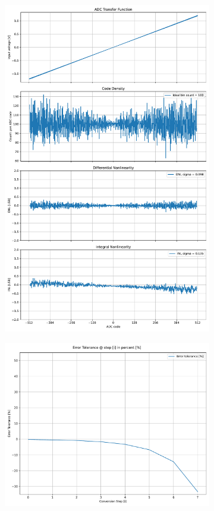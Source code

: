 \documentclass[varwidth]{standalone}
\begin{document}
\begin{figure}
\begin{subfigure}{0.32\textwidth}
    \includegraphics[width=\textwidth]{behavioral_10b_refnoise_nonlinearity.pdf}
\end{subfigure}
\begin{subfigure}{0.32\textwidth}
    \includegraphics[width=\textwidth]{behavioral_10b_refnoise_redundancy.pdf}

\end{subfigure}
\end{figure}
\end{document}

